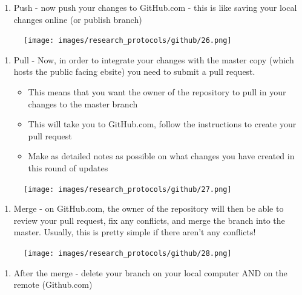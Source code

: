 \documentclass[
]{book}
\providecommand{\tightlist}{%
  \setlength{\itemsep}{0pt}\setlength{\parskip}{0pt}}
\begin{document}
\begin{enumerate}
\def\labelenumi{\arabic{enumi}.}
\setcounter{enumi}{5}
\tightlist
\item
  Push - now push your changes to GitHub.com - this is like saving your local changes online (or publish branch)
\end{enumerate}

\begin{figure}
\centering
\texttt{[image: images/research\_protocols/github/26.png]}
\caption{}
\end{figure}

\begin{enumerate}
\def\labelenumi{\arabic{enumi}.}
\setcounter{enumi}{6}
\tightlist
\item
  Pull - Now, in order to integrate your changes with the master copy (which hosts the public facing ebsite) you need to submit a pull request.

  \begin{itemize}
  \tightlist
  \item
    This means that you want the owner of the repository to pull in your changes to the master branch
  \item
    This will take you to GitHub.com, follow the instructions to create your pull request
  \item
    Make as detailed notes as possible on what changes you have created in this round of updates
  \end{itemize}
\end{enumerate}

\begin{figure}
\centering
\texttt{[image: images/research\_protocols/github/27.png]}
\caption{}
\end{figure}

\begin{enumerate}
\def\labelenumi{\arabic{enumi}.}
\setcounter{enumi}{7}
\tightlist
\item
  Merge - on GitHub.com, the owner of the repository will then be able to review your pull request, fix any conflicts, and merge the branch into the master. Usually, this is pretty simple if there aren't any conflicts!
\end{enumerate}

\begin{figure}
\centering
\texttt{[image: images/research\_protocols/github/28.png]}
\caption{}
\end{figure}

\begin{enumerate}
\def\labelenumi{\arabic{enumi}.}
\setcounter{enumi}{8}
\tightlist
\item
  After the merge - delete your branch on your local computer AND on the remote (Github.com)
\end{enumerate}
\end{document}

